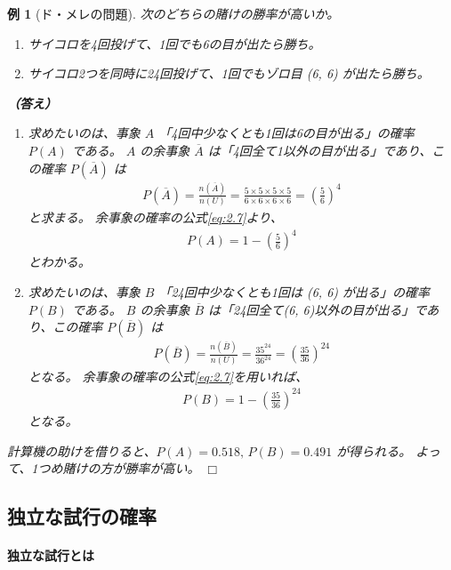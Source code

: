\documentclass[12pt]{ltjsarticle}\usepackage{ifthen}\newcounter{enlarge}\setcounter{enlarge}{1}
\def\qed{\hfill $\Box$}
\newtheorem{eg}{例}
\begin{document}
\begin{eg}[ド・メレの問題]
  次のどちらの賭けの勝率が高いか。
  \begin{enumerate}
  \item サイコロを4回投げて、1回でも6の目が出たら勝ち。
  \item サイコロ2つを同時に24回投げて、1回でもゾロ目 (6, 6) が出たら勝ち。
  \end{enumerate}

  \textbf{（答え）}
  \begin{enumerate}
  \item 求めたいのは、事象 $A$ 「4回中少なくとも1回は6の目が出る」の確率 $P(A)$ である。
    $A$ の余事象 $\overline{A}$ は「4回全て1以外の目が出る」であり、この確率 $P(\overline{A})$ は
    \begin{align}
      P(\overline{A}) = \frac{n(\overline{A})}{n(U)} = \frac{5 \times 5 \times 5 \times 5}{6 \times 6 \times 6 \times 6} = \left( \frac{5}{6} \right)^4 \label{eq:2.7.1}
    \end{align}
    と求まる。
    余事象の確率の公式\eqref{eq:2.7}より、
    \begin{align}
      P(A) = 1 - \left( \frac{5}{6} \right)^4 \label{eq:2.7.2}
    \end{align}
    とわかる。
  \item 求めたいのは、事象 $B$ 「24回中少なくとも1回は (6, 6) が出る」の確率 $P(B)$ である。
    $B$ の余事象 $\overline{B}$ は「24回全て(6, 6)以外の目が出る」であり、この確率 $P(\overline{B})$ は
    \begin{align}
      P(\overline{B}) = \frac{n(\overline{B})}{n(U)} = \frac{35^{24}}{36^{24}} = \left( \frac{35}{36} \right)^{24} \label{eq:2.7.3}
    \end{align}
    となる。
    余事象の確率の公式\eqref{eq:2.7}を用いれば、
    \begin{align}
      P(B) = 1 - \left( \frac{35}{36} \right)^{24} \label{eq:2.7.4}
    \end{align}
    となる。
  \end{enumerate}

  計算機の助けを借りると、$P(A) = 0.518,\, P(B) = 0.491$ が得られる。
  よって、1つめ賭けの方が勝率が高い。
\qed\end{eg}

\subsection{独立な試行の確率}

\paragraph{独立な試行とは}
\end{document}

